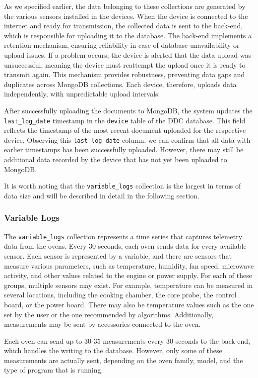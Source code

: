 As we specified earlier, the data belonging to these collections are generated by the various sensors installed in the devices. When the device is connected to the internet and ready for transmission, the collected data is sent to the back-end, which is responsible for uploading it to the database. The back-end implements a retention mechanism, ensuring reliability in case of database unavailability or upload issues. If a problem occurs, the device is alerted that the data upload was unsuccessful, meaning the device must reattempt the upload once it is ready to transmit again. This mechanism provides robustness, preventing data gaps and duplicates across MongoDB collections. Each device, therefore, uploads data independently, with unpredictable upload intervals.

After successfully uploading the documents to MongoDB, the system updates the \texttt{last\_log\_date} timestamp in the \texttt{device} table of the \ac{DDC} database. This field reflects the timestamp of the most recent document uploaded for the respective device. Observing this \texttt{last\_log\_date} column, we can confirm that all data with earlier timestamps has been successfully uploaded. However, there may still be additional data recorded by the device that has not yet been uploaded to MongoDB.

It is worth noting that the \texttt{variable\_logs} collection is the largest in terms of data size and will be described in detail in the following section.
\subsubsection{Variable Logs}
The \texttt{variable\_logs} collection represents a time series that captures telemetry data from the ovens. Every 30 seconds, each oven sends data for every available sensor. Each sensor is represented by a variable, and there are sensors that measure various parameters, such as temperature, humidity, fan speed, microwave activity, and other values related to the engine or power supply. For each of these groups, multiple sensors may exist. For example, temperature can be measured in several locations, including the cooking chamber, the core probe, the control board, or the power board. There may also be temperature values such as the one set by the user or the one recommended by algorithms. Additionally, measurements may be sent by accessories connected to the oven.

Each oven can send up to 30-35 measurements every 30 seconds to the back-end, which handles the writing to the database. However, only some of these measurements are actually sent, depending on the oven family, model, and the type of program that is running.

